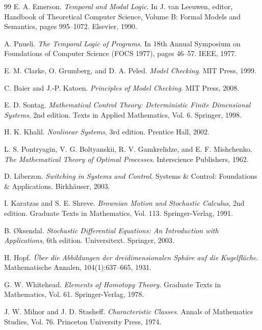 \documentclass[11pt]{article}
\theoremstyle{definition}
\begin{document}
\begin{thebibliography}{99}
E. A. Emerson.
\textit{Temporal and Modal Logic}.
In J. van Leeuwen, editor, Handbook of Theoretical Computer Science, Volume B: Formal Models and Semantics, pages 995--1072. Elsevier, 1990.

A. Pnueli.
\textit{The Temporal Logic of Programs}.
In 18th Annual Symposium on Foundations of Computer Science (FOCS 1977), pages 46--57. IEEE, 1977.

E. M. Clarke, O. Grumberg, and D. A. Peled.
\textit{Model Checking}.
MIT Press, 1999.

C. Baier and J.-P. Katoen.
\textit{Principles of Model Checking}.
MIT Press, 2008.

E. D. Sontag.
\textit{Mathematical Control Theory: Deterministic Finite Dimensional Systems}, 2nd edition.
Texts in Applied Mathematics, Vol. 6. Springer, 1998.

H. K. Khalil.
\textit{Nonlinear Systems}, 3rd edition.
Prentice Hall, 2002.

L. S. Pontryagin, V. G. Boltyanskii, R. V. Gamkrelidze, and E. F. Mishchenko.
\textit{The Mathematical Theory of Optimal Processes}.
Interscience Publishers, 1962.

D. Liberzon.
\textit{Switching in Systems and Control}.
Systems \& Control: Foundations \& Applications. Birkhäuser, 2003.

I. Karatzas and S. E. Shreve.
\textit{Brownian Motion and Stochastic Calculus}, 2nd edition.
Graduate Texts in Mathematics, Vol. 113. Springer-Verlag, 1991.

B. Øksendal.
\textit{Stochastic Differential Equations: An Introduction with Applications}, 6th edition.
Universitext. Springer, 2003.

H. Hopf.
\textit{Über die Abbildungen der dreidimensionalen Sphäre auf die Kugelfläche}.
Mathematische Annalen, 104(1):637--665, 1931.

G. W. Whitehead.
\textit{Elements of Homotopy Theory}.
Graduate Texts in Mathematics, Vol. 61. Springer-Verlag, 1978.

J. W. Milnor and J. D. Stasheff.
\textit{Characteristic Classes}.
Annals of Mathematics Studies, Vol. 76. Princeton University Press, 1974.


\end{thebibliography}
\end{document}
